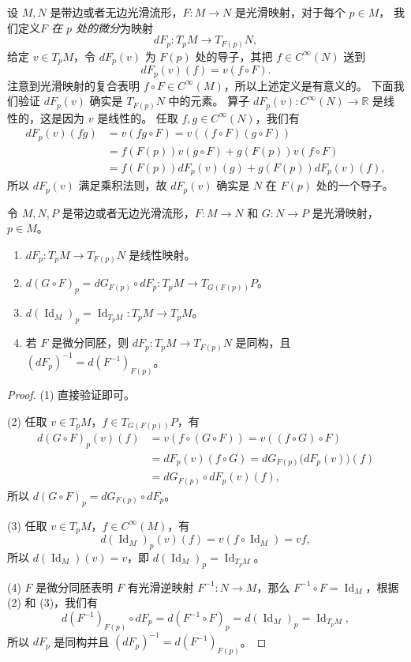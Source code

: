 \documentclass[fontset=none]{Notes}
\DeclareMathOperator\Id{Id}
\begin{document}
设 $M,N$ 是带边或者无边光滑流形，$F:M\to N$ 是光滑映射，对于每个 $p\in M$，
我们定义\emph{$F$ 在 $p$ 处的微分}为映射
\[
  dF_p:T_pM\to T_{F(p)}N  ,
\]
给定 $v\in T_pM$，令 $dF_p(v)$ 为 $F(p)$ 处的导子，其把 $f\in C^\infty(N)$
送到
\[
  dF_p(v)(f)=v(f\circ F).  
\]
注意到光滑映射的复合表明 $f\circ F\in C^\infty(M)$，所以上述定义是有意义的。
下面我们验证 $dF_p(v)$ 确实是 $T_{F(p)}N$ 中的元素。
算子 $dF_p(v):C^\infty(N)\to\mathbb{R}$ 是线性的，这是因为 $v$ 是线性的。
任取 $f,g\in C^\infty(N)$，我们有
\begin{align*}
  dF_p(v)(fg)&=v(fg\circ F)=v((f\circ F)(g\circ F))\\
  &=f(F(p))v(g\circ F)+g(F(p))v(f\circ F)\\
  &=f(F(p))dF_p(v)(g)+g(F(p))dF_p(v)(f),
\end{align*}
所以 $dF_p(v)$ 满足乘积法则，故 $dF_p(v)$ 确实是 $N$ 在 $F(p)$ 处的一个导子。

\begin{proposition}[微分的性质]
  令 $M,N,P$ 是带边或者无边光滑流形，$F:M\to N$ 和 $G:N\to P$ 是光滑映射，
  $p\in M$。 
  \begin{enumerate}
    \item $dF_p:T_pM\to T_{F(p)}N$ 是线性映射。
    \item $d(G\circ F)_p=dG_{F(p)}\circ dF_p:T_pM\to T_{G(F(p))}P$。
    \item $d(\Id_M)_p=\Id_{T_pM}:T_pM\to T_pM$。
    \item 若 $F$ 是微分同胚，则 $dF_p:T_pM\to T_{F(p)}N$ 是同构，且
    $(dF_p)^{-1}=d(F^{-1})_{F(p)}$。
  \end{enumerate}
\end{proposition}
\begin{proof}
  (1) 直接验证即可。

  (2) 任取 $v\in T_pM$，$f\in T_{G(F(p))}P$，有
  \begin{align*}
    d(G\circ F)_p(v)(f)&=v(f\circ (G\circ F))=v((f\circ G)\circ F)\\
    &=dF_p(v)(f\circ G)=dG_{F(p)}\bigl(dF_p(v)\bigr)(f)\\
    &=dG_{F(p)}\circ dF_p(v)(f),
  \end{align*}
  所以 $d(G\circ F)_p=dG_{F(p)}\circ dF_p$。

  (3) 任取 $v\in T_pM$，$f\in C^\infty(M)$，有
  \[
    d(\Id_M)_p(v)(f)=v(f\circ\Id_M)=vf,  
  \]
  所以 $d(\Id_M)(v)=v$，即 $d(\Id_M)_p=\Id_{T_pM}$。

  (4) $F$ 是微分同胚表明 $F$ 有光滑逆映射 $F^{-1}:N\to M$，那么
  $F^{-1}\circ F=\Id_M$，根据 (2) 和 (3)，我们有
  \[
    d(F^{-1})_{F(p)}\circ dF_p=d(F^{-1}\circ F)_p=d(\Id_M)_p=\Id_{T_pM},
  \] 
  所以 $dF_p$ 是同构并且 $(dF_p)^{-1}=d(F^{-1})_{F(p)}$。
\end{proof}
\end{document}
